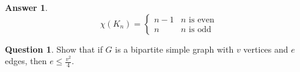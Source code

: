 \documentclass[article, 12pt]{article}
\theoremstyle{definition}
\newtheorem{question}{Question}
\newtheorem{answer}{Answer}
\begin{document}
    \begin{answer}
        \begin{equation*}
            \chi(K_n) = \begin{cases}
                n - 1 & n \text{ is even} \\
                n & n \text{ is odd}
            \end{cases}
        \end{equation*}
    \end{answer}

    \begin{question}
        Show that if $G$ is a bipartite simple graph with $v$ vertices and $e$ edges, then $e \leq \frac{v^2}4$.
    \end{question}

\end{document}
